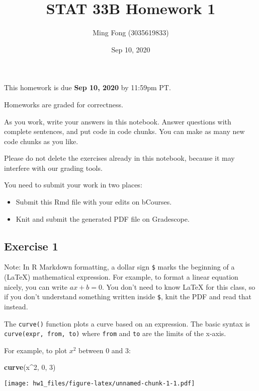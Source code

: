 \documentclass[
]{article}
\title{STAT 33B Homework 1}
\author{Ming Fong (3035619833)}
\date{Sep 10, 2020}
\newenvironment{Shaded}{\begin{snugshade}}{\end{snugshade}}
\newcommand{\DecValTok}[1]{\textcolor[rgb]{0.00,0.00,0.81}{#1}}
\newcommand{\KeywordTok}[1]{\textcolor[rgb]{0.13,0.29,0.53}{\textbf{#1}}}
\newcommand{\NormalTok}[1]{#1}
\newcommand{\OperatorTok}[1]{\textcolor[rgb]{0.81,0.36,0.00}{\textbf{#1}}}
\providecommand{\tightlist}{%
  \setlength{\itemsep}{0pt}\setlength{\parskip}{0pt}}
\begin{document}
\maketitle

This homework is due \textbf{Sep 10, 2020} by 11:59pm PT.

Homeworks are graded for correctness.

As you work, write your answers in this notebook. Answer questions with
complete sentences, and put code in code chunks. You can make as many
new code chunks as you like.

Please do not delete the exercises already in this notebook, because it
may interfere with our grading tools.

You need to submit your work in two places:

\begin{itemize}
\tightlist
\item
  Submit this Rmd file with your edits on bCourses.
\item
  Knit and submit the generated PDF file on Gradescope.
\end{itemize}

\hypertarget{exercise-1}{%
\subsection{Exercise 1}\label{exercise-1}}

Note: In R Markdown formatting, a dollar sign \texttt{\$} marks the
beginning of a (LaTeX) mathematical expression. For example, to format a
linear equation nicely, you can write \(ax + b = 0\). You don't need to
know LaTeX for this class, so if you don't understand something written
inside \texttt{\$}, knit the PDF and read that instead.

The \texttt{curve()} function plots a curve based on an expression. The
basic syntax is \texttt{curve(expr,\ from,\ to)} where \texttt{from} and
\texttt{to} are the limits of the x-axis.

For example, to plot \(x^2\) between 0 and 3:

\begin{Shaded}
\begin{Highlighting}[]
\KeywordTok{curve}\NormalTok{(x}\OperatorTok{\^{}}\DecValTok{2}\NormalTok{, }\DecValTok{0}\NormalTok{, }\DecValTok{3}\NormalTok{)}
\end{Highlighting}
\end{Shaded}

\texttt{[image: hw1\_files/figure-latex/unnamed-chunk-1-1.pdf]}
\end{document}
